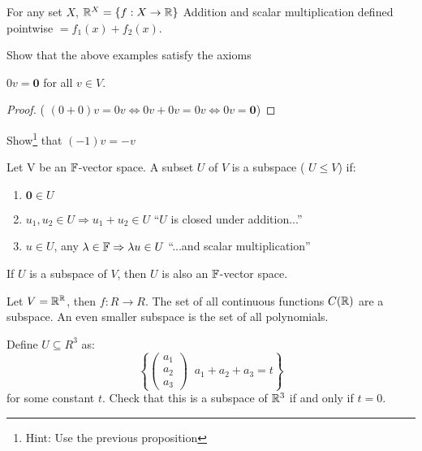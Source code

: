 \documentclass[a4paper]{article}
\begin{document}
\begin{eg}
	For any set $ X $, $ \mathbb{R}^{X} = \{ f : X \to \mathbb{R} \}$
	Addition and scalar multiplication defined pointwise $ = f_{1}(x) + f_{2} (x) $.
\end{eg}


\begin{ex}
	Show that the above examples satisfy the axioms
\end{ex}

\begin{prop} 
	$ 0 v = \mathbf{0} $ for all $ v \in V $.
\end{prop}

\begin{proof}
	( $ (0 + 0)v = 0v \iff 0 v + 0v = 0v \iff 0v = \mathbf{0} $)
\end{proof}

\begin{ex}
	Show\footnote{Hint: Use the previous proposition} that $ (-1)v = -v $
\end{ex}

\begin{defi}
	Let V be an $ \mathbb{F} $-vector space. A subset $ U $ of $ V $ is a subspace ( $ U \leq V $) if: 
	\begin{enumerate}
		\item $ \mathbf{0} \in U $
		\item $ u_{1}, u_{2} \in U  \Rightarrow u_{1} + u_{2} \in U $ ``$ U $ is closed under addition...''
		\item $ u \in U $, any $ \lambda \in \mathbb{F} \Rightarrow \lambda u \in U$ ``...and scalar multiplication''
	\end{enumerate}
\end{defi}


\begin{ex}
	If $ U $ is a subspace of $ V $, then $ U $ is also an $ \mathbb{F} $-vector space.
\end{ex}

\begin{eg}
	Let $ V = \mathbb{R}^{\mathbb{R}} $, then $ f : R \to R $. The set of all continuous functions $ C(\mathbb{R}) $ are a subspace. An even smaller subspace is the set of all polynomials.
\end{eg}


\begin{ex} Define $ U \subseteq R^{3} $ as: 
	\[ \left\{   \begin{pmatrix}
a_{1} \\
a_{2} \\
a_{3}
\end{pmatrix} \; \; a_{1} + a_{2} + a_{3} = t \right\} \]
for some constant  $ t $. 
Check that this is a subspace of $ \mathbb{R}^{3} $ if and only if $ t = 0 $.
\end{ex}
\end{document}
